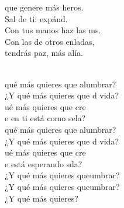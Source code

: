 \documentclass[12pt]{article}
\begin{document}
\begin{multicols*}{2}
\begin{cancion}
	que genere más heros.\\
	Sal de ti: expánd. \\
	Con tus manos haz las ms.\\
	Con las de otros enladas,\\
	tendrás paz, más alía.\\\jump\\
	\begin{chorus}%
	 qué más quieres que alumbrar?\\
	¿Y qué más quieres que d vida?\\
	ué más quieres que cre \\
	e en ti está como sela?\\
\jump
	 qué más quieres que alumbrar?\\
	¿Y qué más quieres que d vida?\\
	ué más quieres que cre \\
	e está esperando sda?\\
\jump
	¿Y qué más quieres queumbrar?\\
	¿Y qué más quieres queumbrar?\\
¿Y qué más quieres?\\
	\end{chorus}%
	\jump\\
\end{cancion}%


\end{multicols*}
\end{document}

